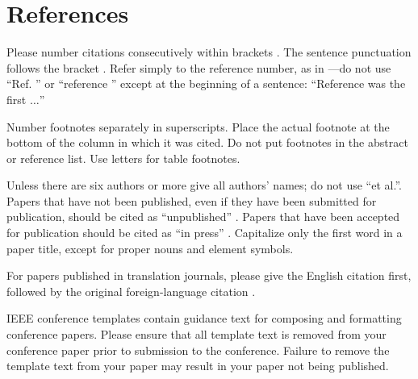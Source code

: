 \documentclass[sigconf]{acmart}
\begin{document}
\section*{References}

Please number citations consecutively within brackets \cite{b1}. The 
sentence punctuation follows the bracket \cite{b2}. Refer simply to the reference 
number, as in \cite{b3}---do not use ``Ref. \cite{b3}'' or ``reference \cite{b3}'' except at 
the beginning of a sentence: ``Reference \cite{b3} was the first $\ldots$''

Number footnotes separately in superscripts. Place the actual footnote at 
the bottom of the column in which it was cited. Do not put footnotes in the 
abstract or reference list. Use letters for table footnotes.

Unless there are six authors or more give all authors' names; do not use 
``et al.''. Papers that have not been published, even if they have been 
submitted for publication, should be cited as ``unpublished'' \cite{b4}. Papers 
that have been accepted for publication should be cited as ``in press'' \cite{b5}. 
Capitalize only the first word in a paper title, except for proper nouns and 
element symbols.

For papers published in translation journals, please give the English 
citation first, followed by the original foreign-language citation \cite{b6}.


\vspace{12pt}
\color{red}
IEEE conference templates contain guidance text for composing and formatting conference papers. Please ensure that all template text is removed from your conference paper prior to submission to the conference. Failure to remove the template text from your paper may result in your paper not being published.
\end{document}
